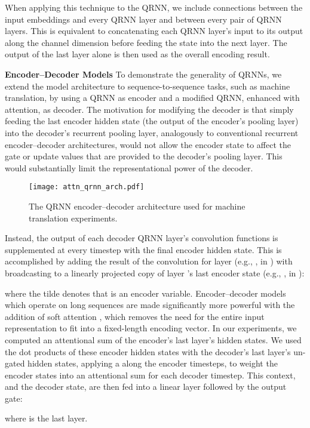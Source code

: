 \documentclass{article} \usepackage{iclr2017_conference,times}
\begin{document}
When applying this technique to the QRNN, we include connections between the input embeddings and every QRNN layer and between every pair of QRNN layers. This is equivalent to concatenating each QRNN layer's input to its output along the channel dimension before feeding the state into the next layer. The output of the last layer alone is then used as the overall encoding result.

\textbf{Encoder--Decoder Models} \label{sec:seq2seq}
To demonstrate the generality of QRNNs, we extend the model architecture to sequence-to-sequence tasks, such as machine translation, by using a QRNN as encoder and a modified QRNN, enhanced with attention, as decoder. The motivation for modifying the decoder is that simply feeding the last encoder hidden state (the output of the encoder's pooling layer) into the decoder's recurrent pooling layer, analogously to conventional recurrent encoder--decoder architectures, would not allow the encoder state to affect the gate or update values that are provided to the decoder's pooling layer. This would substantially limit the representational power of the decoder.
\begin{figure}
\centering
\texttt{[image: attn\_qrnn\_arch.pdf]}
\caption{The QRNN encoder--decoder architecture used for machine translation experiments.}
\end{figure}

Instead, the output of each decoder QRNN layer's convolution functions is supplemented at every timestep with the final encoder hidden state. This is accomplished by adding the result of the convolution for layer  (e.g., , in ) with broadcasting to a linearly projected copy of layer 's last encoder state (e.g., , in ):

where the tilde denotes that  is an encoder variable.
Encoder--decoder models which operate on long sequences are made significantly more powerful with the addition of soft attention \citep{Bahdanau2015}, which removes the need for the entire input representation to fit into a fixed-length encoding vector. In our experiments, we computed an attentional sum of the encoder's last layer's hidden states. We used the dot products of these encoder hidden states with the decoder's last layer's un-gated hidden states, applying a  along the encoder timesteps, to weight the encoder states into an attentional sum  for each decoder timestep.
This context, and the decoder state, are then fed into a linear layer followed by the output gate:

where  is the last layer.
\end{document}
